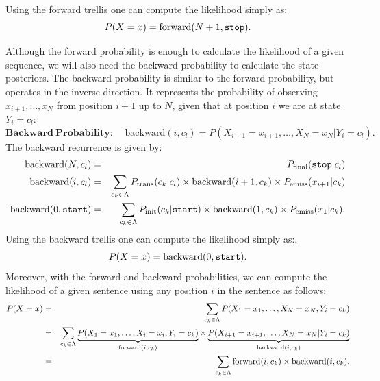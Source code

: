 Using the forward trellis one can compute the likelihood simply as:
\begin{equation}
\label{eq:forwardSum}
P(X=x) = \mathrm{forward}(N+1, \text{\tt stop}).
\end{equation}

Although the forward probability is enough to calculate the likelihood
of a given sequence, we will also need the backward probability to
calculate the state posteriors. 
The backward probability is similar to the forward probability, but operates in the inverse direction.
It 
represents the probability of observing $x_{i+1},\ldots,x_N$ from position $i+1$ up to $N$, given that at position $i$ we are at state $Y_i = c_l$:
 \begin{equation}
\label{eq::backward}
\mathbf{Backward \ Probability\!:}\;\;\;\;  \mathrm{backward}(i, c_l) = P(X_{i+1}=x_{i+1},\ldots, X_N=x_N | Y_i = c_l).
\end{equation}
The backward recurrence is given by:
\begin{eqnarray}
\mathrm{backward}(N, c_l) &=& P_{\mathrm{final}}(\text{\tt stop} | c_l) 
 \\
 \mathrm{backward}(i, c_l) &=&  \displaystyle \sum_{c_k \in \Lambda} P_{\mathrm{trans}}(c_k | c_l) \times \mathrm{backward}(i+1, c_k) \times P_{\mathrm{emiss}}(x_{i+1} | c_k)  \label{backwardRecursion}
 \\
  \mathrm{backward}(0, \text{\tt start}) &=& \sum_{c_k \in \Lambda} P_{\mathrm{init}}(c_k | \text{\tt start}) \times \mathrm{backward}(1, c_k) \times P_{\mathrm{emiss}}(x_{1} | c_k).
\end{eqnarray}
Using the backward trellis one can compute the likelihood simply as:.
\begin{equation}
\label{eq:backwardSum}
P(X=x) = \mathrm{backward}(0, \text{\tt start}).
\end{equation}
Moreover, with the forward and backward 
probabilities, we can compute the likelihood of a given sentence using any position $i$ in the sentence
as follows:
\begin{eqnarray}
\label{eq::fbsanity}
  P(X=x) &=& 
  \sum_{c_k \in \Lambda} P(X_1=x_1,\ldots, X_N=x_N,Y_i=c_k)\nonumber\\
  &=&
  \sum_{c_k \in \Lambda} 
  \underbrace{P(X_1=x_1,\ldots, X_i=x_i, Y_i=c_k)}_{\mathrm{forward}(i,c_k)} \times 
  \underbrace{P(X_{i+1}=x_{i+1},\ldots, X_N=x_N| Y_i=c_k)}_{\mathrm{backward}(i,c_k)}\nonumber\\
  &=& \sum_{c_k \in \Lambda} \mathrm{forward}(i,c_k) \times \mathrm{backward}(i,c_k).
\end{eqnarray}

